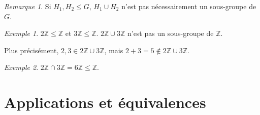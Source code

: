 \documentclass{report}
\newcommand*{\lte}{\leqslant}
\newcommand*{\entiers}{\mathbb{Z}}
\theoremstyle{definition}
\theoremstyle{remark}
\newtheorem*{exem}{Exemple}
\newtheorem*{rema}{Remarque}
\begin{document}
	\begin{rema}
		Si $H_1,H_2 \lte G$, $H_1 \cup H_2$ n'est pas n\'ecessairement un sous-groupe de $G$.
		\begin{exem}
			$2\entiers \lte \entiers$ et $3\entiers \lte \entiers$. $2\entiers \cup 3\entiers$ n'est pas un sous-groupe de $\entiers$.

			Plus pr\'ecis\'ement, $2,3 \in 2\entiers \cup 3\entiers$, mais $2+3=5 \not\in 2\entiers \cup 3\entiers$.
		\end{exem}
	\end{rema}
	\begin{exem}
		$2\entiers \cap 3\entiers = 6\entiers \lte \entiers$.
	\end{exem}

	\setcounter{chapter}{1}
	\chapter{Applications et \'equivalences}
	\setcounter{section}{3}
\end{document}

